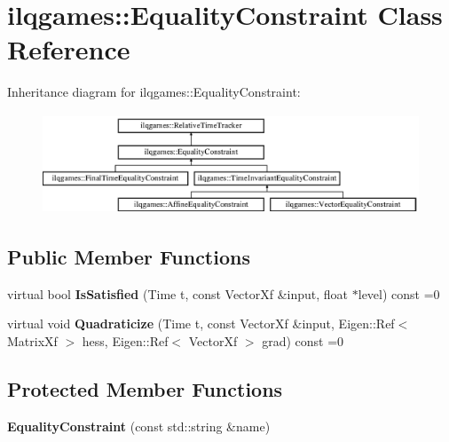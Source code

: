 \hypertarget{classilqgames_1_1_equality_constraint}{}\section{ilqgames\+:\+:Equality\+Constraint Class Reference}
\label{classilqgames_1_1_equality_constraint}
Inheritance diagram for ilqgames\+:\+:Equality\+Constraint\+:\begin{figure}[H]
\begin{center}
\leavevmode
\includegraphics[height=2.986667cm]{classilqgames_1_1_equality_constraint}
\end{center}
\end{figure}
\subsection*{Public Member Functions}
\begin{DoxyCompactItemize}
\item 
virtual bool {\bfseries Is\+Satisfied} (Time t, const Vector\+Xf \&input, float $\ast$level) const =0\hypertarget{classilqgames_1_1_equality_constraint_a18b587978ddca5a30465d37a26598c4e}{}\label{classilqgames_1_1_equality_constraint_a18b587978ddca5a30465d37a26598c4e}

\item 
virtual void {\bfseries Quadraticize} (Time t, const Vector\+Xf \&input, Eigen\+::\+Ref$<$ Matrix\+Xf $>$ hess, Eigen\+::\+Ref$<$ Vector\+Xf $>$ grad) const =0\hypertarget{classilqgames_1_1_equality_constraint_abb19ed581b76ce802fd54bf962542a69}{}\label{classilqgames_1_1_equality_constraint_abb19ed581b76ce802fd54bf962542a69}

\end{DoxyCompactItemize}
\subsection*{Protected Member Functions}
\begin{DoxyCompactItemize}
\item 
{\bfseries Equality\+Constraint} (const std\+::string \&name)\hypertarget{classilqgames_1_1_equality_constraint_a53eaee4d6a2ce7ea4190c0d50b89eb76}{}\label{classilqgames_1_1_equality_constraint_a53eaee4d6a2ce7ea4190c0d50b89eb76}

\end{DoxyCompactItemize}

